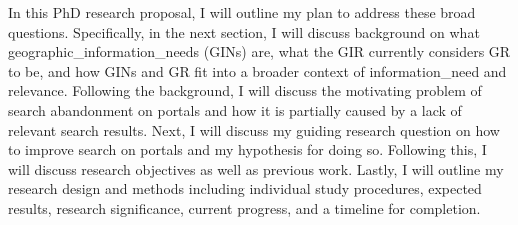 In this PhD research proposal, I will outline my plan to address these broad questions. Specifically, in the next section, I will discuss background on what \gls{geographic_information_needs} (\acrshort{GIN}s) are, what the GIR currently considers GR to be, and how GINs and GR fit into a broader context of \gls{information_need} and relevance. Following the background, I will discuss the motivating problem of search abandonment on portals and how it is partially caused by a lack of relevant search results. Next, I will discuss my guiding research question on how to improve search on portals and my hypothesis for doing so. Following this, I will discuss research objectives as well as previous work. Lastly, I will outline my research design and methods including individual study procedures, expected results, research significance, current progress, and a timeline for completion.

